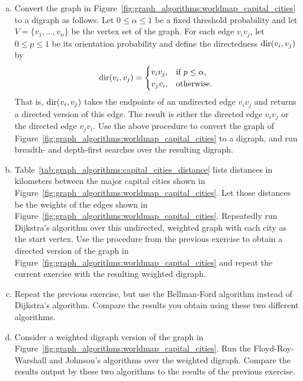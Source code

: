 \begin{problem}
\begin{enumerate}[(a)]
  \item Convert the graph in
    Figure~\ref{fig:graph_algorithms:worldmap_capital_cities} to a
    digraph as follows. Let $0 \leq \alpha \leq 1$ be a fixed
    threshold probability and let
    $V = \{v_1, \dots, v_n\}$ be the vertex set of the graph. For each
    edge $v_i v_j$, let $0 \leq p \leq 1$ be its
    orientation probability and define
    the directedness $\operatorname*{dir}(v_i, v_j)$\index{$\dir$} by
    \[
    \operatorname*{dir}(v_i, v_j)
    =
    \begin{cases}
    v_i v_j, & \text{if $p \leq \alpha$,} \\
    v_j v_i, & \text{otherwise.}
    \end{cases}
    \]
    That is, $\operatorname*{dir}(v_i, v_j)$ takes the endpoints of an undirected
    edge $v_i v_j$ and returns a directed version of this edge. The
    result is either the directed edge $v_i v_j$ or the directed edge
    $v_j v_i$. Use the above procedure to convert the graph of
    Figure~\ref{fig:graph_algorithms:worldmap_capital_cities} to a
    digraph, and run breadth- and
    depth-first searches over the resulting
    digraph.

  \item Table~\ref{tab:graph_algorithms:capital_cities_distance} lists
    distances in kilometers between the major capital cities shown in
    Figure~\ref{fig:graph_algorithms:worldmap_capital_cities}. Let
    those distances be the weights of the edges shown in
    Figure~\ref{fig:graph_algorithms:worldmap_capital_cities}. Repeatedly
    run Dijkstra's algorithm over this
    undirected, weighted graph with each city as the start vertex. Use
    the procedure from the previous exercise to obtain a directed
    version of the graph in
    Figure~\ref{fig:graph_algorithms:worldmap_capital_cities} and
    repeat the current exercise with the resulting weighted digraph.

  \item Repeat the previous exercise, but use the
    Bellman-Ford algorithm instead of
    Dijkstra's algorithm. Compare the
    results you obtain using these two different algorithms.

  \item Consider a weighted digraph version of the graph in
    Figure~\ref{fig:graph_algorithms:worldmap_capital_cities}. Run the
    Floyd-Roy-Warshall and
    Johnson's algorithms over the weighted
    digraph. Compare the results output by these two algorithms to the
    results of the previous exercise.
  \end{enumerate}


\end{problem}
